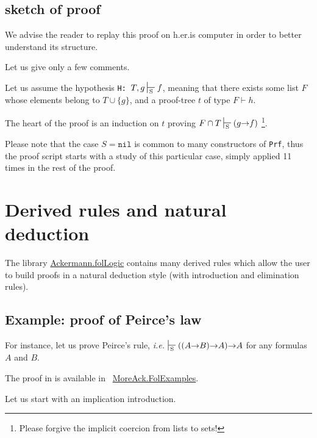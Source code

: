 
\subsection{sketch of proof}

We advise the reader to replay this proof on h.er.is computer
 in order to better understand its structure. 

Let us give only a few comments.


Let us assume the hypothesis \texttt{H: $T, g \sdash f$},
meaning that there exists some list $F$ whose elements 
belong to $T \cup \{g\}$, and a proof-tree $t$ of type
$F \vdash h$.

The heart of the proof is an induction on $t$ proving 
$F \cap T \sdash (g\arrow f)$ \footnote{Please forgive the implicit coercion from lists to sets!}. 

Please note that the case $S=\texttt{nil}$ is common to 
many constructors of \texttt{Prf}, thus the proof script starts
with a study of this particular case, simply applied 11 times in the rest of the proof. 






\section{Derived rules and natural deduction}


 The library 
 \href{../theories/html/hydras.Ackermann.folLogic.html}{Ackermann.folLogic} contains many derived rules which allow the user to build proofs in a natural deduction style (with introduction and elimination rules).

\subsection{Example: proof of Peirce's law}

For instance, let us prove Peirce's rule, \emph{i.e.}
$\sdash ((A \arrow B) \arrow A) \arrow A$ for any formulas $A$ and $B$.

 The proof in \coq is available in  ~\href{../theories/html/hydras.MoreAck.FolExamples.html}{MoreAck.FolExamples}.


Let us start with  an implication introduction.


